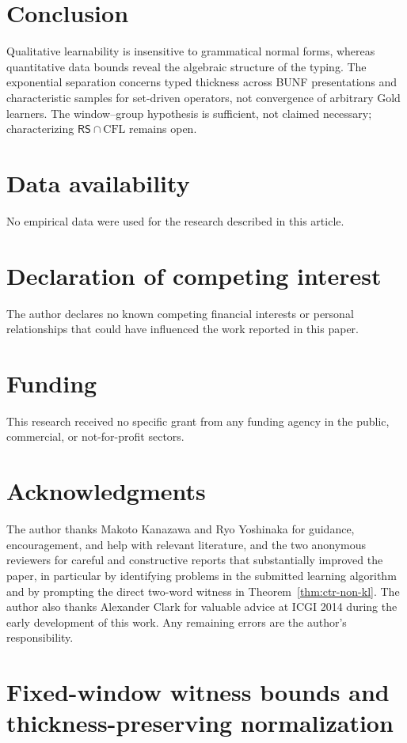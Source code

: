\documentclass[11pt,a4paper]{article}
\theoremstyle{remark}
\theoremstyle{plain}
\begin{document}
\section{Conclusion}

Qualitative learnability is insensitive to grammatical normal
forms, whereas quantitative data bounds reveal the algebraic
structure of the typing. The exponential separation concerns
typed thickness across BUNF presentations and characteristic
samples for set-driven operators, not convergence of arbitrary
Gold learners. The window--group hypothesis is sufficient,
not claimed necessary; characterizing
$\mathsf{RS}\cap\mathrm{CFL}$ remains open.

\section*{Data availability}
No empirical data were used for the research described in this article.

\section*{Declaration of competing interest}
The author declares no known competing financial interests or personal
relationships that could have influenced the work reported in this paper.

\section*{Funding}
This research received no specific grant from any funding agency in the
public, commercial, or not-for-profit sectors.

\section*{Acknowledgments}
The author thanks Makoto Kanazawa and Ryo Yoshinaka for guidance,
encouragement, and help with relevant literature, and the two anonymous
reviewers for careful and constructive reports that substantially improved
the paper, in particular by identifying problems in the submitted learning
algorithm and by prompting the direct two-word witness in
Theorem~\ref{thm:ctr-non-kl}.
The author also thanks Alexander Clark for valuable advice at
ICGI 2014 during the early development of this work.
Any remaining errors are the author's responsibility.

\appendix
\section{Fixed-window witness bounds and thickness-preserving normalization}
\label{app:fixed-window-bounds}
\end{document}
